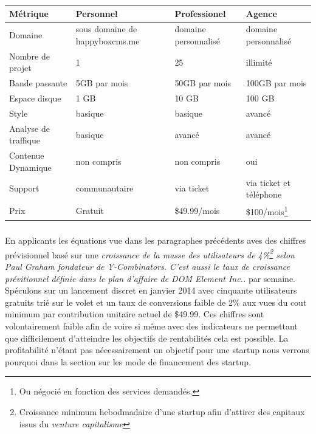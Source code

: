 \documentclass[11pt, a4paper ]{article}
\begin{document}
\begin{spacing}{1.5}
\begin{flushleft}
	\begin{tabular}{|l|l|l|l|}
		Métrique & Personnel & Professionel & Agence \\
		\hline
		Domaine & sous domaine de happyboxcms.me & domaine personnalisé & domaine personnalisé \\
		Nombre de projet & 1 & 25 & illimité \\
		Bande passante & 5GB par mois & 50GB par mois & 100GB par mois \\
		Espace disque & 1 GB & 10 GB & 100 GB \\
		Style & basique & basique & avancé \\
		Analyse de traffique & basique & avancé & avancé \\
		Contenue Dynamique & non compris & non compris & oui \\
		Support & communautaire & via ticket & via ticket et téléphone  \\
		Prix & Gratuit & \$49.99/mois & \$100/mois\footnote{Ou négocié en fonction des services demandés.} \\

	\end{tabular}
\end{flushleft}
\subparagraph{}
En applicants les équations vue dans les paragraphes précédents aves des chiffres prévisionnel basé sur une \emph{croissance de la masse des utilisateurs de 4\%\footnote{Croissance minimum hebodmadaire d'une startup afin d'attirer des capitaux issus du \emph{venture capitalisme}} selon Paul Graham fondateur de Y-Combinators. C'est aussi le taux de croissance prévitionnel définie dans le plan d'affaire de DOM Element Inc..} par semaine.
Spéculons sur un lancement discret en janvier 2014 avec cinquante utilisateurs gratuits trié sur le volet et un taux de conversions faible de 2\% aux vues du cout minimum par contribution unitaire actuel de \$49.99. Ces chiffres sont volontairement faible afin de voire si même avec des indicateurs ne permettant que difficilement d'atteindre les objectifs de rentabilités cela est possible. La profitabilité n'étant pas nécessairement un objectif pour une startup nous verrons pourquoi dans la section sur les mode de financement des startup.



\end{spacing}
\end{document}
